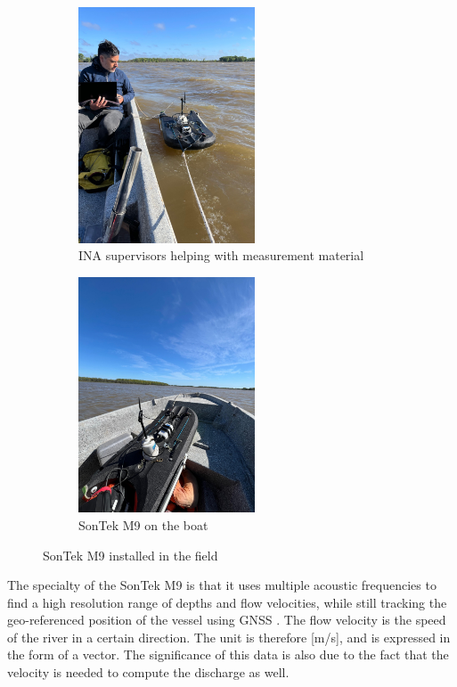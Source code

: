 \begin{figure}[htbp]
    \centering
    \begin{subfigure}[b]{0.48\textwidth}
        \includegraphics[width=\linewidth, height=7cm]{figures/ch4/sonteknico.jpg}
        \caption{INA supervisors helping with measurement material}
        
    \end{subfigure}
    \hfill
    \begin{subfigure}[b]{0.48\textwidth}
        \includegraphics[width=\linewidth, height=7cm]{figures/ch4/sontek.jpg}
        \caption{SonTek M9 on the boat}
        
    \end{subfigure}
    \caption{SonTek M9 installed in the field}
    \label{fig:measurement}
\end{figure}

The specialty of the SonTek M9 is that it uses multiple acoustic frequencies to find a high resolution range of depths and flow velocities, while still tracking the geo-referenced position of the vessel using GNSS \autocite{advanced river discharge}. The flow velocity is the speed of the river in a certain direction. The unit is therefore  [m/s], and is expressed in the form of a vector. The significance of this data is also due to the fact that the velocity is needed to compute the discharge as well.

